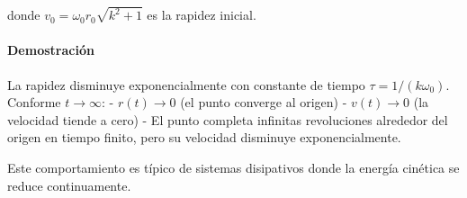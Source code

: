 \begin{sol}
donde $v_0 = \omega_0 r_0 \sqrt{k^2 + 1}$ es la rapidez inicial.

\paragraph{Demostración}

La rapidez disminuye exponencialmente con constante de tiempo $\tau = 1/(k\omega_0)$. Conforme $t \to \infty$:
- $r(t) \to 0$ (el punto converge al origen)
- $v(t) \to 0$ (la velocidad tiende a cero)
- El punto completa infinitas revoluciones alrededor del origen en tiempo finito, pero su velocidad disminuye exponencialmente.

Este comportamiento es típico de sistemas disipativos donde la energía cinética se reduce continuamente.

\end{sol}
